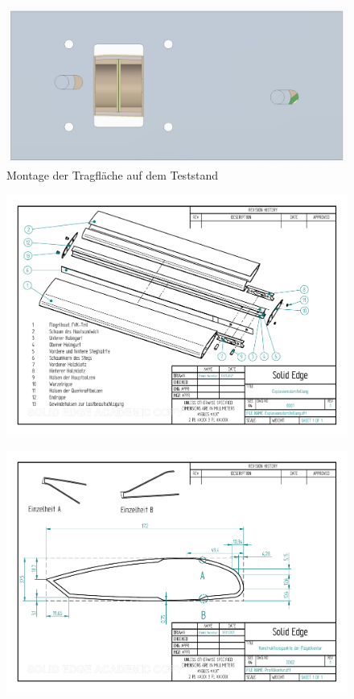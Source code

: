 \begin{figure}[h]
	\includegraphics[width=1.0\textwidth]{Bilder/MontagePlatte.jpg}
	\caption{Montage der Tragfläche auf dem Teststand}
	\label{fig:MontagePlatte}
\end{figure}
\begin{figure}[h]
	\includegraphics[angle=90, scale=0.75]{PDFs/Explosionsdarstellung.pdf}
	\centering
\end{figure}
\begin{figure}[h]
	\includegraphics[angle=90, scale=0.75]{PDFs/Profilkontur.pdf}
	\centering
\end{figure}
